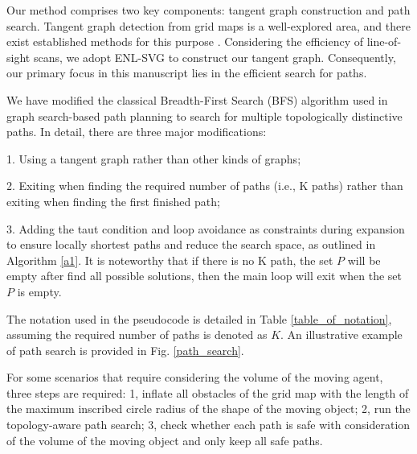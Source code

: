 \documentclass[letterpaper, 10 pt, journal, twoside]{IEEEtran}
\begin{document}
Our method comprises two key components: tangent graph construction and path search. Tangent graph detection from grid maps is a well-explored area, and there exist established methods for this purpose \cite{8, 17, 10}. Considering the efficiency of line-of-sight scans, we adopt ENL-SVG\cite{oh2017edge} to construct our tangent graph. Consequently, our primary focus in this manuscript lies in the efficient search for paths.

We have modified the classical Breadth-First Search (BFS) algorithm used in graph search-based path planning to search for multiple topologically distinctive paths. In detail, there are three major modifications:

1. Using a tangent graph rather than other kinds of graphs;
 
2. Exiting when finding the required number of paths (i.e., K paths) rather than exiting when finding the first finished path;

3. Adding the taut condition\cite{oh2017edge} and loop avoidance as constraints during expansion to ensure locally shortest paths and reduce the search space, as outlined in Algorithm \ref{a1}. It is noteworthy that if there is no K path, the set $P$ will be empty after find all possible solutions, then the main loop will exit when the set $P$ is empty.

The notation used in the pseudocode is detailed in Table \ref{table_of_notation}, assuming the required number of paths is denoted as $K$. An illustrative example of path search is provided in Fig. \ref{path_search}. 

For some scenarios that require considering the volume of the moving agent, three steps are required:
1, inflate all obstacles of the grid map with the length of the maximum inscribed circle radius of the shape of the moving object;
2, run the topology-aware path search;
3, check whether each path is safe with consideration of the volume of the moving object and only keep all safe paths.
\end{document}
